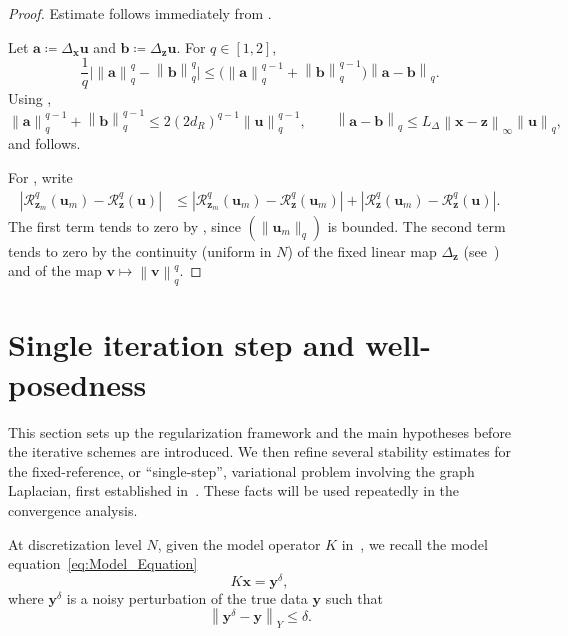 \documentclass{article}
\theoremstyle{remark}
\newcommand{\norm}[1]{\left\lVert #1 \right\rVert}
\newcommand{\Rreg}{\mathcal{R}}
\newcommand{\bx}{{\bm{x}}}
\newcommand{\by}{{\bm{y}}}
\newcommand{\bz}{{\bm{z}}}
\newcommand{\bu}{{\bm{u}}}
\newcommand{\bv}{{\bm{v}}}
\newcommand{\ba}{{\bm{a}}}
\newcommand{\bb}{{\bm{b}}}
\begin{document}
\begin{proof}
Estimate  follows immediately from .

Let $\ba\coloneqq\Delta_\bx \bu$ and $\bb\coloneqq\Delta_\bz \bu$. For $q\in[1,2]$,
\[
\frac1q\bigl|\norm{\ba}_q^q-\norm{\bb}_q^q\bigr|
\le \bigl(\norm{\ba}_q^{q-1}+\norm{\bb}_q^{q-1}\bigr)
\norm{\ba-\bb}_q.
\]
 Using ,
\[
\norm{\ba}_q^{q-1}+\norm{\bb}_q^{q-1}
\le 2(2d_R)^{q-1}\norm{\bu}_q^{q-1},
\qquad
\norm{\ba-\bb}_q\le L_\Delta\norm{\bx-\bz}_\infty\norm{\bu}_q,
\]
and  follows.

For , write
\[
\begin{aligned}
|\Rreg_{\bz_m}^q(\bu_m)-\Rreg_\bz^q(\bu)|
&\le |\Rreg_{\bz_m}^q(\bu_m)-\Rreg_\bz^q(\bu_m)|
+|\Rreg_\bz^q(\bu_m)-\Rreg_\bz^q(\bu)|.
\end{aligned}
\]
The first term tends to zero by , since $(\|\bu_m\|_q)$ is bounded. The second term tends to zero by the continuity (uniform in $N$) of the fixed linear map $\Delta_\bz$ (see~) and of the map $\bv\mapsto\norm{\bv}_q^q$.
\end{proof}

\section{Single iteration step and well-posedness}\label{sec:preliminary_estimates}
This section sets up the regularization framework and the main hypotheses before the iterative schemes are introduced. We then refine several stability estimates for the fixed-reference, or ``single-step'', variational problem involving the graph Laplacian, first established in~\cite{bianchi2025data}. These facts will be used repeatedly in the convergence analysis.

At discretization level $N$, given the model operator $K$ in~, we recall the model equation~\cref{eq:Model_Equation}
\begin{equation*}
K\bx=\by^\delta,
\end{equation*}
where $\by^\delta$ is a noisy perturbation of the true data $\by$ such that
\begin{equation*}
\norm{\by^\delta-\by}_Y\le \delta.
\end{equation*}
\end{document}
